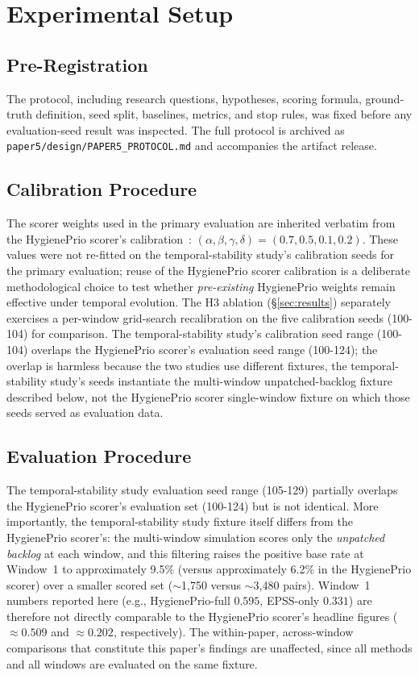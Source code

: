 \section{Experimental Setup}

\subsection{Pre-Registration}

The protocol, including research questions, hypotheses, scoring formula, ground-truth definition, seed split, baselines, metrics, and stop rules, was fixed before any evaluation-seed result was inspected. The full protocol is archived as \texttt{paper5/design/PAPER5\_PROTOCOL.md} and accompanies the artifact release.

\subsection{Calibration Procedure}

The scorer weights used in the primary evaluation are inherited verbatim from the HygienePrio scorer's calibration~\cite{paper4hygieneprio}: $(\alpha, \beta, \gamma, \delta) = (0.7, 0.5, 0.1, 0.2)$. These values were not re-fitted on the temporal-stability study's calibration seeds for the primary evaluation; reuse of the HygienePrio scorer calibration is a deliberate methodological choice to test whether \textit{pre-existing} HygienePrio weights remain effective under temporal evolution. The H3 ablation (\S\ref{sec:results}) separately exercises a per-window grid-search recalibration on the five calibration seeds (100-104) for comparison. The temporal-stability study's calibration seed range (100-104) overlaps the HygienePrio scorer's evaluation seed range (100-124); the overlap is harmless because the two studies use different fixtures, the temporal-stability study's seeds instantiate the multi-window unpatched-backlog fixture described below, not the HygienePrio scorer single-window fixture on which those seeds served as evaluation data.

\subsection{Evaluation Procedure}

The temporal-stability study evaluation seed range (105-129) partially overlaps the HygienePrio scorer's evaluation set (100-124) but is not identical. More importantly, the temporal-stability study fixture itself differs from the HygienePrio scorer's: the multi-window simulation scores only the \textit{unpatched backlog} at each window, and this filtering raises the positive base rate at Window~1 to approximately 9.5\% (versus approximately 6.2\% in the HygienePrio scorer) over a smaller scored set ($\sim$1{,}750 versus $\sim$3{,}480 pairs). Window~1 numbers reported here (e.g., HygienePrio-full $0.595$, EPSS-only $0.331$) are therefore not directly comparable to the HygienePrio scorer's headline figures ($\approx 0.509$ and $\approx 0.202$, respectively). The within-paper, across-window comparisons that constitute this paper's findings are unaffected, since all methods and all windows are evaluated on the same fixture.

